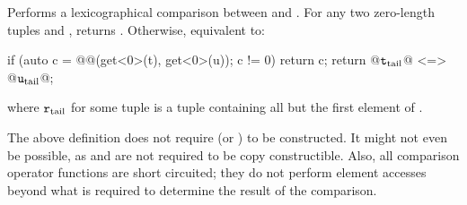 \documentclass{wg21}
\begin{document}
\begin{itemdescr}
    \pnum
    \effects
    Performs a lexicographical comparison between  and .
    For any two zero-length tuples  and ,
     returns .
    Otherwise, equivalent to:
    \begin{codeblock}
        if (auto c = @@(get<0>(t), get<0>(u)); c != 0) return c;
        return @$\texttt{t}_\mathrm{tail}$@ <=> @$\texttt{u}_\mathrm{tail}$@;
    \end{codeblock}
    where $\texttt{r}_\mathrm{tail}$ for some tuple 
    is a tuple containing all but the first element of .
\end{itemdescr}

\pnum
\begin{note}
    The above definition does not require 
    (or ) to be constructed. It might not
    even be possible, as  and  are not required to be copy
    constructible. Also, all comparison operator functions are short circuited;
    they do not perform element accesses beyond what is required to determine the
    result of the comparison.
\end{note}
\end{document}
